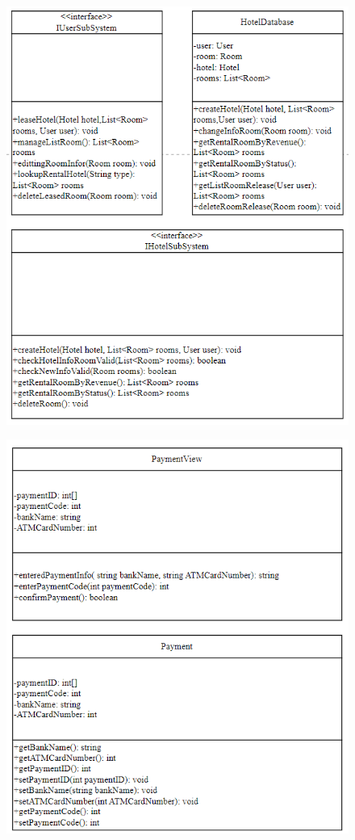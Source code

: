 \begin{figure}[H]
    \centering
    \includegraphics[width=\linewidth]{img3.6/9.png}
\end{figure}
\begin{figure}[H]
    \centering
    \includegraphics[width=\linewidth]{img3.6/10.png}
\end{figure}
